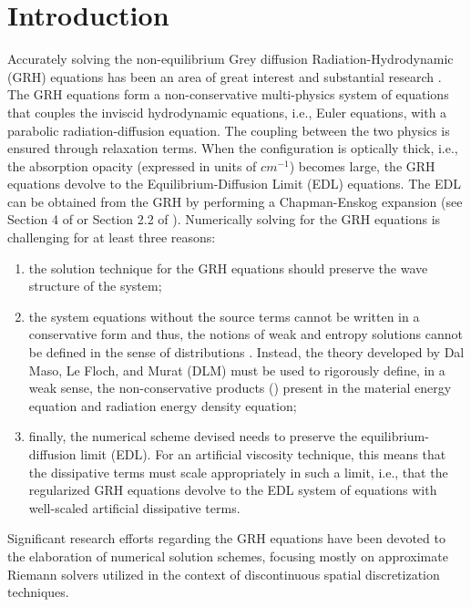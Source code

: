 \documentclass[times,doublespace]{fldauth}%
\begin{document}
\section{Introduction}
\label{sec:intro}
Accurately solving the non-equilibrium Grey diffusion Radiation-Hydrodynamic (GRH) equations has been an area of great interest and substantial research \cite{Balsara,LowrieMorelHittinger,EdwardsMorelLowrie}.
The GRH equations form a non-conservative multi-physics system of equations that couples the inviscid hydrodynamic equations, i.e., Euler equations, with a parabolic radiation-diffusion equation. 
The coupling between the two physics is ensured through relaxation terms. When the configuration is optically thick, i.e., the absorption opacity (expressed in units of $cm^{-1}$) becomes large, the GRH equations devolve to the Equilibrium-Diffusion Limit (EDL) equations. 
The EDL can be obtained from the GRH by performing a Chapman-Enskog expansion (see Section 4 of \cite{LowrieMorel} or Section 2.2 of \cite{our_jcp_radhy_paper}).
Numerically solving for the GRH equations is challenging for at least three reasons: 
\begin{enumerate}
\item
the solution technique for the GRH equations should preserve the wave structure of the system; 
\item
the system equations without the source terms cannot be written in a conservative form and thus, the notions of weak and entropy solutions cannot be defined in the sense of distributions \cite{dlm, lefloch_1988, lefloch_1989, lefloch_liu_1993, bianchini_bressan_2005}.  Instead, the theory developed by Dal Maso, Le Floch, and Murat (DLM) must be used to rigorously define, in a weak sense, the non-conservative products (\cite{dlm}) present in the material energy equation and radiation energy density equation;
\item
finally, the numerical scheme devised needs to preserve the equilibrium-diffusion limit (EDL). For an artificial viscosity technique, this means that the dissipative terms must scale appropriately in such a limit, i.e., that the regularized GRH equations 
devolve to the EDL system of equations with well-scaled artificial dissipative terms.
\end{enumerate}
%
Significant research efforts regarding the GRH equations have been devoted to the elaboration of numerical solution schemes, focusing mostly on approximate Riemann solvers utilized in the context of discontinuous spatial discretization techniques.
\end{document}
